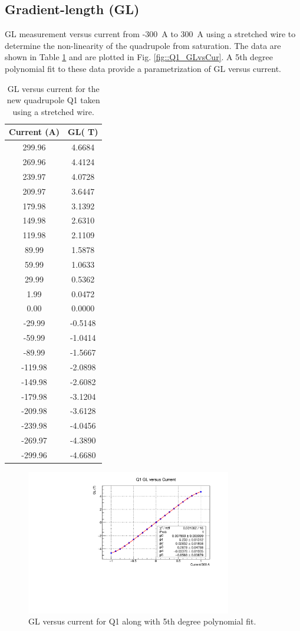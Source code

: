 \documentclass[12pt]{article}
\begin{document}
\subsection{Gradient-length (GL)}
GL measurement versus current from -300~A to 300~A using a stretched wire to determine the non-linearity of the quadrupole from saturation. The data are shown in Table \ref{tab:Q1_GLvsCur} and are plotted in Fig. \ref{fig::Q1_GLvsCur}. A 5th degree polynomial fit to these data provide a parametrization of GL versus current.
\begin{table}
\centering
\caption{\label{tab:Q1_GLvsCur}GL versus current for the new quadrupole Q1 taken using a stretched wire.}
\begin{tabular}{|c|c|}
\hline
Current (A)&	GL( T)\\\hline
299.96&	4.6684\\
269.96&	4.4124\\
239.97&	4.0728\\
209.97&	3.6447\\
179.98&	3.1392\\
149.98&	2.6310\\
119.98&	2.1109\\
89.99&	1.5878\\
59.99&	1.0633\\
29.99&	0.5362\\
1.99	  &       0.0472\\
0.00	  &      0.0000\\
-29.99&	-0.5148\\
-59.99&	-1.0414\\
-89.99&	-1.5667\\
-119.98&	-2.0898\\
-149.98&	-2.6082\\
-179.98&	-3.1204\\
-209.98&	-3.6128\\
-239.98&	-4.0456\\
-269.97&	-4.3890\\
-299.96&	-4.6680\\\hline
\end{tabular}
\end{table}
\begin{figure}
\centering
\includegraphics[width=0.8\textwidth]{Q1_GLvsCur.pdf}
\caption{\label{fig:Q1_GLvsCur}GL versus current for Q1 along with 5th degree polynomial fit. }
\end{figure}
\end{document}
